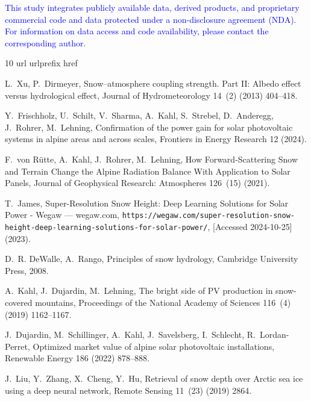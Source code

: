 \documentclass[preprint,12pt]{elsarticle}
\begin{document}
\textcolor{blue}{This study integrates publicly available data, derived products, and proprietary commercial code and data protected under a non-disclosure agreement (NDA). For information on data access and code availability, please contact the corresponding author.}

\begin{thebibliography}{10}
\expandafter\ifx\csname url\endcsname\relax
  \def\url#1{\texttt{#1}}\fi
\expandafter\ifx\csname urlprefix\endcsname\relax\def\urlprefix{URL }\fi
\expandafter\ifx\csname href\endcsname\relax
  \def\href#1#2{#2} \def\path#1{#1}\fi

L.~Xu, P.~Dirmeyer, {Snow--atmosphere coupling strength. Part II: Albedo effect versus hydrological effect}, Journal of Hydrometeorology 14~(2) (2013) 404--418.

Y.~Frischholz, U.~Schilt, V.~Sharma, A.~Kahl, S.~Strebel, D.~Anderegg, J.~Rohrer, M.~Lehning, {Confirmation of the power gain for solar photovoltaic systems in alpine areas and across scales}, Frontiers in Energy Research 12 (2024).

F.~von R\"{u}tte, A.~Kahl, J.~Rohrer, M.~Lehning, {How Forward‐Scattering Snow and Terrain Change the Alpine Radiation Balance With Application to Solar Panels}, Journal of Geophysical Research: Atmospheres 126~(15) (2021).

T.~James, {S}uper-{R}esolution {S}now {H}eight: {D}eep {L}earning {S}olutions for {S}olar {P}ower - {W}egaw --- wegaw.com, \url{https://wegaw.com/super-resolution-snow-height-deep-learning-solutions-for-solar-power/}, [Accessed 2024-10-25] (2023).

D.~R. DeWalle, A.~Rango, Principles of snow hydrology, Cambridge University Press, 2008.

A.~Kahl, J.~Dujardin, M.~Lehning, {The bright side of PV production in snow-covered mountains}, Proceedings of the National Academy of Sciences 116~(4) (2019) 1162--1167.

J.~Dujardin, M.~Schillinger, A.~Kahl, J.~Savelsberg, I.~Schlecht, R.~Lordan-Perret, Optimized market value of alpine solar photovoltaic installations, Renewable Energy 186 (2022) 878–888.

J.~Liu, Y.~Zhang, X.~Cheng, Y.~Hu, {Retrieval of snow depth over Arctic sea ice using a deep neural network}, Remote Sensing 11~(23) (2019) 2864.


\end{thebibliography}
\end{document}
